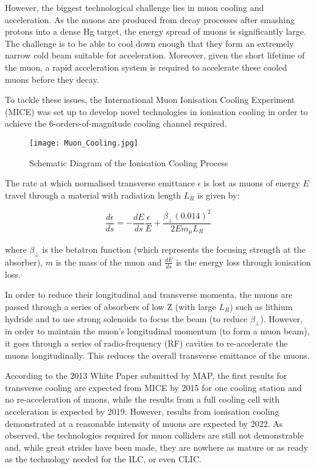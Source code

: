 However, the biggest technological challenge lies in muon cooling and acceleration. As the muons are produced from decay processes after smashing protons into a dense Hg target, the energy spread of muons is significantly large. The challenge is to be able to cool down enough that they form an extremely narrow cold beam suitable for acceleration. Moreover, given the short lifetime of the muon, a rapid acceleration system is required to accelerate these cooled muons before they decay.
 
To tackle these issues, the International Muon Ionisation Cooling Experiment (MICE) was set up to develop novel technologies in ionisation cooling in order to achieve the 6-orders-of-magnitude cooling channel required.
 
\begin{figure}[!htb]
\centering
\texttt{[image: Muon\_Cooling.jpg]}
\caption{Schematic Diagram of the Ionisation Cooling Process}
\end{figure}
 
The rate at which normalised transverse emittance $\epsilon$ is lost as muons of energy $E$ travel through a material with radiation length $L_R$ is given by:
 
\begin{equation}
    \frac{d \epsilon}{ds} = - \frac{dE}{ds} \frac{\epsilon}{E} + \frac{\beta_{\perp} (0.014)^2}{2 E m_{\mu} L_R}
\end{equation}
 
where $\beta_{\perp}$ is the betatron function (which represents the focusing strength at the absorber), $m$ is the mass of the muon and $\frac{dE}{ds}$ is the energy loss through ionisation loss. 

In order to reduce their longitudinal and transverse momenta, the muons are passed through a series of absorbers of low Z (with large $L_R$) such as lithium hydride and to use strong solenoids to focus the beam (to reduce $\beta_{\perp}$). However, in order to maintain the muon's longitudinal momentum (to form a muon beam), it goes through a series of radio-frequency (RF) cavities to re-accelerate the muons longitudinally. This reduces the overall transverse emittance of the muons.
 
According to the 2013 White Paper submitted by MAP, the first results for transverse cooling are expected from MICE by 2015 for one cooling station and no re-acceleration of muons, while the results from a full cooling cell with acceleration is expected by 2019. However, results from ionisation cooling demonstrated at a reasonable intensity of muons are expected by 2022. As observed, the technologies required for muon colliders are still not demonstrable and, while great strides have been made, they are nowhere as mature or as ready as the technology needed for the ILC, or even CLIC.
 
